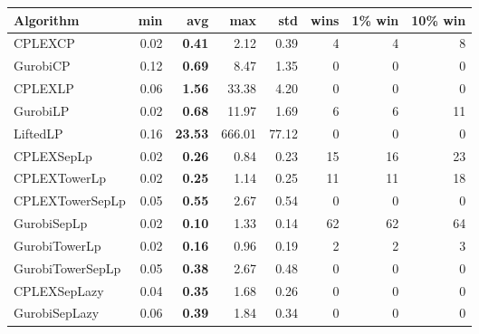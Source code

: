 \begin{tabular}{lrrrrrrr}
Algorithm & min & avg & max & std
& wins & 1\% win & 10\% win 
\\
\hline
CPLEXCP&0.02& \bf0.41& 2.12& 0.39&4&4&8\\
GurobiCP&0.12& \bf0.69& 8.47& 1.35&0&0&0\\
CPLEXLP&0.06& \bf1.56& 33.38& 4.20&0&0&0\\
GurobiLP&0.02& \bf0.68& 11.97& 1.69&6&6&11\\
LiftedLP&0.16& \bf23.53& 666.01& 77.12&0&0&0\\
CPLEXSepLp&0.02& \bf0.26& 0.84& 0.23&15&16&23\\
CPLEXTowerLp&0.02& \bf0.25& 1.14& 0.25&11&11&18\\
CPLEXTowerSepLp&0.05& \bf0.55& 2.67& 0.54&0&0&0\\
GurobiSepLp&0.02& \bf0.10& 1.33& 0.14&62&62&64\\
GurobiTowerLp&0.02& \bf0.16& 0.96& 0.19&2&2&3\\
GurobiTowerSepLp&0.05& \bf0.38& 2.67& 0.48&0&0&0\\
CPLEXSepLazy&0.04& \bf0.35& 1.68& 0.26&0&0&0\\
GurobiSepLazy&0.06& \bf0.39& 1.84& 0.34&0&0&0
\end{tabular}
